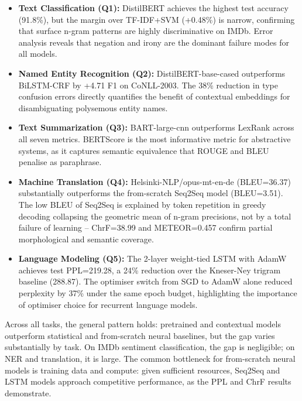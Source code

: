 \documentclass[11pt,a4paper]{article}
\begin{document}
\begin{itemize}
    \item \textbf{Text Classification (Q1):} DistilBERT achieves the highest test accuracy (91.8\%), but the margin over TF-IDF+SVM (+0.48\%) is narrow, confirming that surface n-gram patterns are highly discriminative on IMDb. Error analysis reveals that negation and irony are the dominant failure modes for all models.

    \item \textbf{Named Entity Recognition (Q2):} DistilBERT-base-cased outperforms BiLSTM-CRF by +4.71 F1 on CoNLL-2003. The 38\% reduction in type confusion errors directly quantifies the benefit of contextual embeddings for disambiguating polysemous entity names.

    \item \textbf{Text Summarization (Q3):} BART-large-cnn outperforms LexRank across all seven metrics. BERTScore is the most informative metric for abstractive systems, as it captures semantic equivalence that ROUGE and BLEU penalise as paraphrase.

    \item \textbf{Machine Translation (Q4):} Helsinki-NLP/opus-mt-en-de (BLEU=36.37) substantially outperforms the from-scratch Seq2Seq model (BLEU=3.51). The low BLEU of Seq2Seq is explained by token repetition in greedy decoding collapsing the geometric mean of n-gram precisions, not by a total failure of learning -- ChrF=38.99 and METEOR=0.457 confirm partial morphological and semantic coverage.

    \item \textbf{Language Modeling (Q5):} The 2-layer weight-tied LSTM with AdamW achieves test PPL=219.28, a 24\% reduction over the Kneser-Ney trigram baseline (288.87). The optimiser switch from SGD to AdamW alone reduced perplexity by 37\% under the same epoch budget, highlighting the importance of optimiser choice for recurrent language models.
\end{itemize}

Across all tasks, the general pattern holds: pretrained and contextual models outperform statistical and from-scratch neural baselines, but the gap varies substantially by task. On IMDb sentiment classification, the gap is negligible; on NER and translation, it is large. The common bottleneck for from-scratch neural models is training data and compute: given sufficient resources, Seq2Seq and LSTM models approach competitive performance, as the PPL and ChrF results demonstrate.
\end{document}
